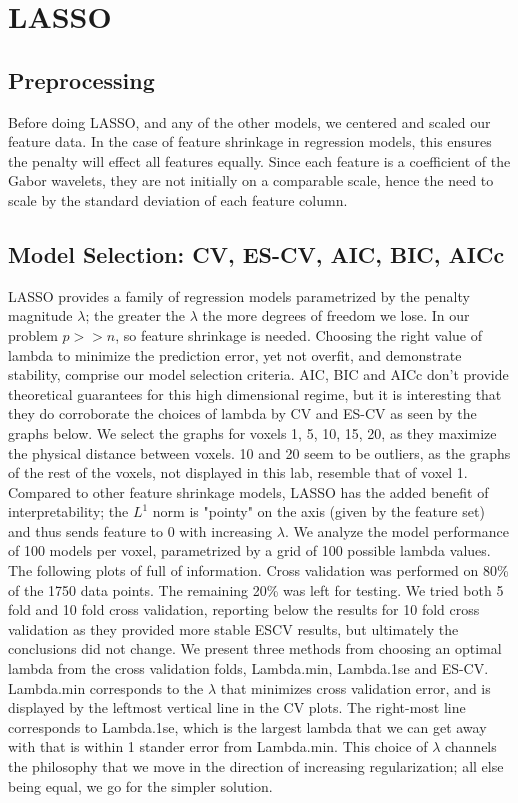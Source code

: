 \documentclass[english]{amsart}
\begin{document}
\section{LASSO}

\subsection{Preprocessing}
Before doing LASSO, and any of the other models, we centered and scaled our feature data.  In the case of feature shrinkage in regression models, this ensures the penalty will effect all features equally.  Since each feature is a coefficient of the Gabor wavelets, they are not initially on a comparable scale, hence the need to scale by the standard deviation of each feature column.  

\subsection{Model Selection: CV, ES-CV, AIC, BIC, AICc}

LASSO provides a family of regression models parametrized by the penalty magnitude $\lambda$; the greater the $\lambda$ the more degrees of freedom we lose.  In our problem $p >> n$, so feature shrinkage is needed. Choosing the right value of lambda to minimize the prediction error, yet not overfit, and demonstrate stability, comprise our model selection criteria.  AIC, BIC and AICc don't provide theoretical guarantees for this high dimensional regime, but it is interesting that they do corroborate the choices of lambda by CV and ES-CV as seen by the graphs below.  We select the graphs for voxels 1, 5, 10, 15, 20, as they maximize the physical distance between voxels. 10 and 20 seem to be outliers, as the graphs of the rest of the voxels, not displayed in this lab, resemble that of voxel 1. Compared to other feature shrinkage models, LASSO has the added benefit of interpretability; the $L^1$ norm is "pointy" on the axis (given by the feature set) and thus sends feature to 0 with increasing $\lambda$.   We analyze the model performance of 100 models per voxel, parametrized by a grid of 100 possible lambda values.\\

The following plots of full of information.  Cross validation was performed on 80\% of the 1750 data points.  The remaining 20\% was left for testing.  We tried both 5 fold and 10 fold cross validation, reporting below the results for 10 fold cross validation as they provided more stable ESCV results, but ultimately the conclusions did not change.  We present three methods from choosing an optimal lambda from the cross validation folds, Lambda.min, Lambda.1se and ES-CV.  Lambda.min corresponds to  the $\lambda$ that minimizes cross validation error, and is displayed by the leftmost vertical line in the CV plots.  The right-most line corresponds to Lambda.1se, which is the largest lambda that we can get away with that is within 1 stander error from Lambda.min.  This choice of $\lambda$ channels the philosophy that we move in the direction of increasing regularization; all else being equal, we go for the simpler solution.   \\
\end{document}
